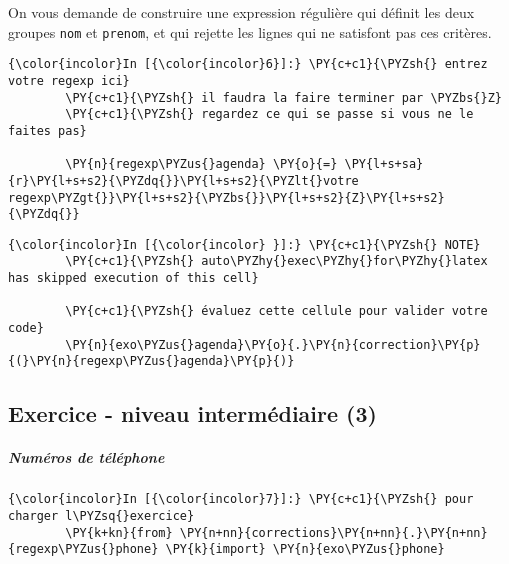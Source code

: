     On vous demande de construire une expression régulière qui définit les
deux groupes \texttt{nom} et \texttt{prenom}, et qui rejette les lignes
qui ne satisfont pas ces critères.

    \begin{Verbatim}[commandchars=\\\{\},frame=single,framerule=0.3mm,rulecolor=\color{cellframecolor}]
{\color{incolor}In [{\color{incolor}6}]:} \PY{c+c1}{\PYZsh{} entrez votre regexp ici}
        \PY{c+c1}{\PYZsh{} il faudra la faire terminer par \PYZbs{}Z}
        \PY{c+c1}{\PYZsh{} regardez ce qui se passe si vous ne le faites pas}
        
        \PY{n}{regexp\PYZus{}agenda} \PY{o}{=} \PY{l+s+sa}{r}\PY{l+s+s2}{\PYZdq{}}\PY{l+s+s2}{\PYZlt{}votre regexp\PYZgt{}}\PY{l+s+s2}{\PYZbs{}}\PY{l+s+s2}{Z}\PY{l+s+s2}{\PYZdq{}}
\end{Verbatim}


    \begin{Verbatim}[commandchars=\\\{\},frame=single,framerule=0.3mm,rulecolor=\color{cellframecolor}]
{\color{incolor}In [{\color{incolor} }]:} \PY{c+c1}{\PYZsh{} NOTE}
        \PY{c+c1}{\PYZsh{} auto\PYZhy{}exec\PYZhy{}for\PYZhy{}latex has skipped execution of this cell}
        
        \PY{c+c1}{\PYZsh{} évaluez cette cellule pour valider votre code}
        \PY{n}{exo\PYZus{}agenda}\PY{o}{.}\PY{n}{correction}\PY{p}{(}\PY{n}{regexp\PYZus{}agenda}\PY{p}{)}
\end{Verbatim}


    \hypertarget{exercice---niveau-intermuxe9diaire-3}{%
\subsection{Exercice - niveau intermédiaire
(3)}\label{exercice---niveau-intermuxe9diaire-3}}

    \hypertarget{numuxe9ros-de-tuxe9luxe9phone}{%
\subparagraph{Numéros de
téléphone}\label{numuxe9ros-de-tuxe9luxe9phone}}

    \begin{Verbatim}[commandchars=\\\{\},frame=single,framerule=0.3mm,rulecolor=\color{cellframecolor}]
{\color{incolor}In [{\color{incolor}7}]:} \PY{c+c1}{\PYZsh{} pour charger l\PYZsq{}exercice}
        \PY{k+kn}{from} \PY{n+nn}{corrections}\PY{n+nn}{.}\PY{n+nn}{regexp\PYZus{}phone} \PY{k}{import} \PY{n}{exo\PYZus{}phone}
\end{Verbatim}


